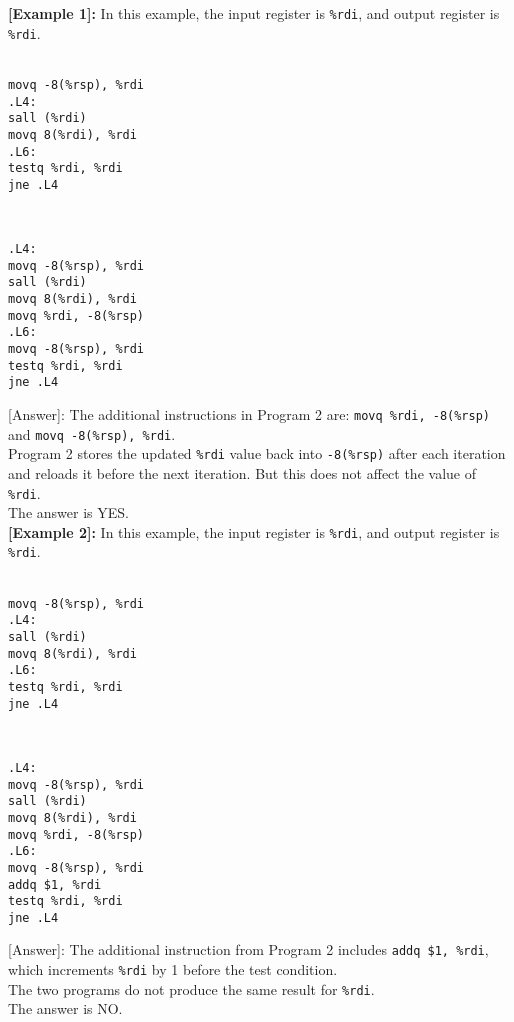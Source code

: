 \noindent\textbf{[Example 1]:} In this example, the input register is \texttt{\%rdi}, and output register is \texttt{\%rdi}.\\
\text{[Program 1]:}\\
\begin{lstlisting}
movq -8(%rsp), %rdi
.L4:
sall (%rdi)
movq 8(%rdi), %rdi
.L6:
testq %rdi, %rdi
jne .L4
\end{lstlisting}
\text{[Program 2]:}\\
\begin{lstlisting}
.L4:
movq -8(%rsp), %rdi
sall (%rdi)
movq 8(%rdi), %rdi
movq %rdi, -8(%rsp)
.L6:
movq -8(%rsp), %rdi
testq %rdi, %rdi
jne .L4
\end{lstlisting}
[Answer]: The additional instructions in Program 2 are: \texttt{movq \%rdi, -8(\%rsp)} and \texttt{movq -8(\%rsp), \%rdi}.\\
Program 2 stores the updated \texttt{\%rdi} value back into \texttt{-8(\%rsp)} after each iteration and reloads it before the next iteration. But this does not affect the value of \texttt{\%rdi}.\\
The answer is YES.\\

\noindent\textbf{[Example 2]:} In this example, the input register is \texttt{\%rdi}, and output register is \texttt{\%rdi}.\\
\text{[Program 1]:}\\
\begin{lstlisting}
movq -8(%rsp), %rdi
.L4:
sall (%rdi)
movq 8(%rdi), %rdi
.L6:
testq %rdi, %rdi
jne .L4
\end{lstlisting}
\text{[Program 2]:}\\
\begin{lstlisting}
.L4:
movq -8(%rsp), %rdi
sall (%rdi)
movq 8(%rdi), %rdi
movq %rdi, -8(%rsp)
.L6:
movq -8(%rsp), %rdi
addq $1, %rdi
testq %rdi, %rdi
jne .L4
\end{lstlisting}
[Answer]: The additional instruction from Program 2 includes \texttt{addq \$1, \%rdi}, which increments \texttt{\%rdi} by 1 before the test condition.\\
The two programs do not produce the same result for \texttt{\%rdi}.\\
The answer is NO.\\

